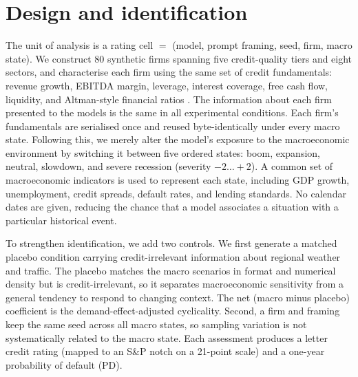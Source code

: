 \documentclass[a4paper,fleqn]{cas-sc}
\begin{document}
\section{Design and identification}\label{sec:design}
The unit of analysis is a rating cell $=$ (model, prompt framing, seed, firm, macro state). We
construct $80$ synthetic firms spanning five credit-quality tiers and eight sectors, and characterise
each firm using the same set of credit fundamentals: revenue growth, EBITDA margin, leverage, interest
coverage, free cash flow, liquidity, and Altman-style financial ratios \citep{altman1968}. The
information about each firm presented to the models is the same in all experimental conditions. Each
firm's fundamentals are serialised once and reused byte-identically under every macro state. Following
this, we merely alter the model's exposure to the macroeconomic environment by switching it between
five ordered states: boom, expansion, neutral, slowdown, and severe recession (severity
$-2\ldots+2$). A common set of macroeconomic indicators is used to represent each state, including GDP
growth, unemployment, credit spreads, default rates, and lending standards. No calendar dates are
given, reducing the chance that a model associates a situation with a particular historical event.

To strengthen identification, we add two controls. We first generate a matched placebo condition
carrying credit-irrelevant information about regional weather and traffic. The placebo matches the macro scenarios in format and numerical
density but is credit-irrelevant, so it separates macroeconomic sensitivity from a general tendency to
respond to changing context. The net (macro minus placebo) coefficient is the demand-effect-adjusted
cyclicality. Second, a firm and framing keep the same seed across all macro states, so sampling
variation is not systematically related to the macro state. Each assessment produces a letter credit rating (mapped to an
S\&P notch on a 21-point scale) and a one-year probability of default (PD).
\end{document}
